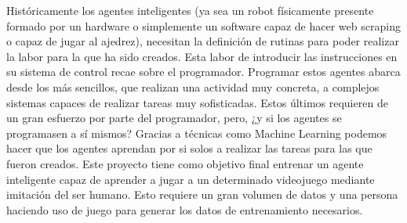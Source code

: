 
Históricamente los agentes inteligentes (ya sea un robot físicamente presente formado por un hardware o simplemente un software capaz de hacer web scraping o capaz de jugar al ajedrez), necesitan la definición de rutinas para poder realizar la labor para la que ha sido creados. Esta labor de introducir las instrucciones en su sistema de control recae sobre el programador. Programar estos agentes abarca desde los más sencillos, que realizan una actividad muy concreta, a complejos sistemas capaces de realizar tareas muy sofisticadas. Estos últimos requieren de un gran esfuerzo por parte del programador, pero, ¿y si los agentes se programasen a sí mismos? Gracias a técnicas como Machine Learning podemos hacer que los agentes aprendan por si solos a realizar las tareas para las que fueron creados.
Este proyecto tiene como objetivo final entrenar un agente inteligente capaz de aprender a jugar a un determinado videojuego mediante imitación del ser humano. Esto requiere un gran volumen de datos y una persona haciendo uso de juego para generar los datos de entrenamiento necesarios.